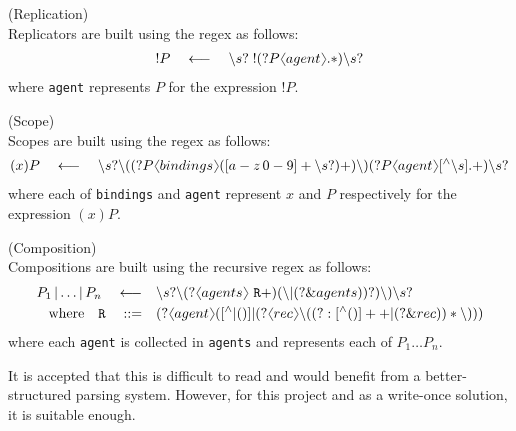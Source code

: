         \begin{definition}{(Replication)\\}
            Replicators are built using the regex as follows:
            \begin{align*}
                ! P \quad \longleftarrow \quad \backslash s? \; !(?P \langl agent \rangl.*)\backslash s?
            \end{align*}
            where \texttt{agent} represents $P$ for the expression $!P$.
        \end{definition}

        \begin{definition}{(Scope)\\}
            Scopes are built using the regex as follows:
            \begin{align*}
                (x)P \quad \longleftarrow \quad \backslash s? \backslash ((?P \langl bindings \rangl([a-z \, 0-9]+ \backslash s?)+)\backslash )(?P\langl agent \rangl[^{\wedge}\backslash s].+)\backslash s?
            \end{align*}
            where each of \texttt{bindings} and \texttt{agent} represent $x$ and $P$ respectively for the expression $(x) P$.
        \end{definition}

        \begin{definition}{(Composition)\\}
            Compositions are built using the recursive regex as follows:
            \begin{align*}
                P_1 \, | \ldots | \, P_n \quad \longleftarrow \quad & \backslash s? \backslash (?\langl agents\rangl~\texttt{R}+) (\backslash | (?\&agents))?)\backslash )\backslash s? \\
                \text{where} \quad \texttt{R} \quad \defeq \quad & (?\langl agent\rangl([^{\wedge}|()] | (?\langl rec\rangl\backslash ((?:[^{\wedge}()]++|(?\&rec))*\backslash )))
            \end{align*}
            where each \texttt{agent} is collected in \texttt{agents} and represents each of $P_1 \ldots P_n$.
        \end{definition}
        It is accepted that this is difficult to read and would benefit from a better-structured parsing system.
        However, for this project and as a write-once solution, it is suitable enough.


